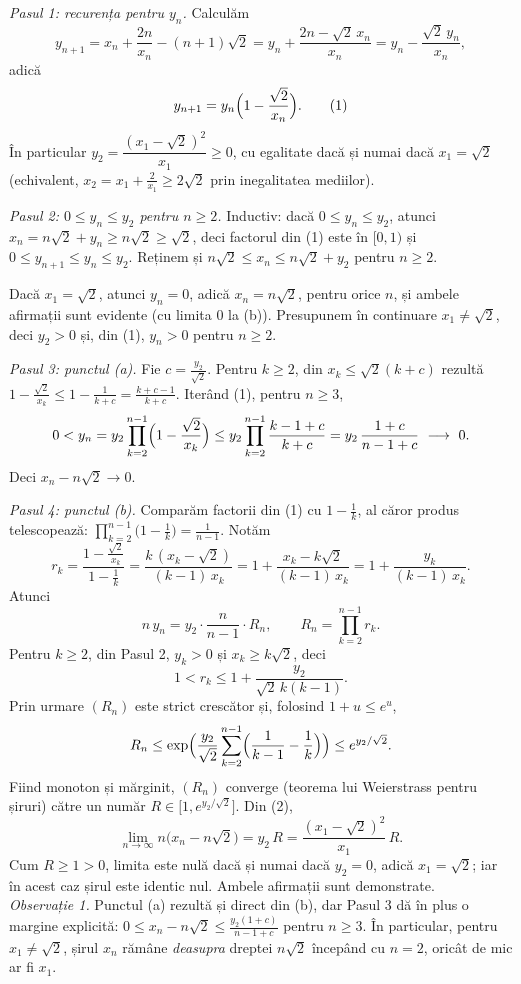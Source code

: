 \emph{Pasul 1: recurența pentru $y_n$.} Calculăm
\[ y_{n+1}=x_n+\frac{2n}{x_n}-(n+1)\sqrt2=y_n+\frac{2n-\sqrt2\,x_n}{x_n}=y_n-\frac{\sqrt2\,y_n}{x_n}, \]
adică
\[ y_{n+1}=y_n\Bigl(1-\frac{\sqrt2}{x_n}\Bigr) . \tag{1} \]
În particular $y_2=\dfrac{(x_1-\sqrt2)^2}{x_1}\ge0$, cu egalitate dacă și numai dacă $x_1=\sqrt2$ (echivalent, $x_2=x_1+\frac2{x_1}\ge2\sqrt2$ prin inegalitatea mediilor).

\emph{Pasul 2: $0\le y_n\le y_2$ pentru $n\ge2$.} Inductiv: dacă $0\le y_n\le y_2$, atunci $x_n=n\sqrt2+y_n\ge n\sqrt2\ge\sqrt2$, deci factorul din (1) este în $[0,1)$ și $0\le y_{n+1}\le y_n\le y_2$. Reținem și $n\sqrt2\le x_n\le n\sqrt2+y_2$ pentru $n\ge2$.

Dacă $x_1=\sqrt2$, atunci $y_n=0$, adică $x_n=n\sqrt2$, pentru orice $n$, și ambele afirmații sunt evidente (cu limita $0$ la (b)). Presupunem în continuare $x_1\neq\sqrt2$, deci $y_2>0$ și, din (1), $y_n>0$ pentru $n\ge2$.

\emph{Pasul 3: punctul (a).} Fie $c=\frac{y_2}{\sqrt2}$. Pentru $k\ge2$, din $x_k\le\sqrt2(k+c)$ rezultă $1-\frac{\sqrt2}{x_k}\le1-\frac1{k+c}=\frac{k+c-1}{k+c}$. Iterând (1), pentru $n\ge3$,
\[ 0<y_n=y_2\prod_{k=2}^{n-1}\Bigl(1-\frac{\sqrt2}{x_k}\Bigr)\le y_2\prod_{k=2}^{n-1}\frac{k-1+c}{k+c}=y_2\,\frac{1+c}{n-1+c}\ \longrightarrow\ 0 . \]
Deci $x_n-n\sqrt2\to0$.

\emph{Pasul 4: punctul (b).} Comparăm factorii din (1) cu $1-\frac1k$, al căror produs telescopează: $\prod_{k=2}^{n-1}\bigl(1-\frac1k\bigr)=\frac1{n-1}$. Notăm
\[ r_k=\frac{1-\frac{\sqrt2}{x_k}}{1-\frac1k}=\frac{k\,(x_k-\sqrt2)}{(k-1)\,x_k}=1+\frac{x_k-k\sqrt2}{(k-1)\,x_k}=1+\frac{y_k}{(k-1)\,x_k} . \]
Atunci
\[ n\,y_n=y_2\cdot\frac{n}{n-1}\cdot R_n,\qquad R_n=\prod_{k=2}^{n-1}r_k . \tag{2} \]
Pentru $k\ge2$, din Pasul 2, $y_k>0$ și $x_k\ge k\sqrt2$, deci
\[ 1<r_k\le1+\frac{y_2}{\sqrt2\,k(k-1)} . \]
Prin urmare $(R_n)$ este strict crescător și, folosind $1+u\le e^u$,
\[ R_n\le\exp\Bigl(\frac{y_2}{\sqrt2}\sum_{k=2}^{n-1}\Bigl(\frac1{k-1}-\frac1k\Bigr)\Bigr)\le e^{y_2/\sqrt2} . \]
Fiind monoton și mărginit, $(R_n)$ converge (teorema lui Weierstrass pentru șiruri) către un număr $R\in\bigl[1,e^{y_2/\sqrt2}\bigr]$. Din (2),
\[ \lim_{n\to\infty}n\bigl(x_n-n\sqrt2\bigr)=y_2\,R=\frac{(x_1-\sqrt2)^2}{x_1}\,R . \]
Cum $R\ge1>0$, limita este nulă dacă și numai dacă $y_2=0$, adică $x_1=\sqrt2$; iar în acest caz șirul este identic nul. Ambele afirmații sunt demonstrate.\\[2pt]
\emph{Observație 1.} Punctul (a) rezultă și direct din (b), dar Pasul 3 dă în plus o margine explicită: $0\le x_n-n\sqrt2\le\frac{y_2(1+c)}{n-1+c}$ pentru $n\ge3$. În particular, pentru $x_1\neq\sqrt2$, șirul $x_n$ rămâne \emph{deasupra} dreptei $n\sqrt2$ începând cu $n=2$, oricât de mic ar fi $x_1$.

